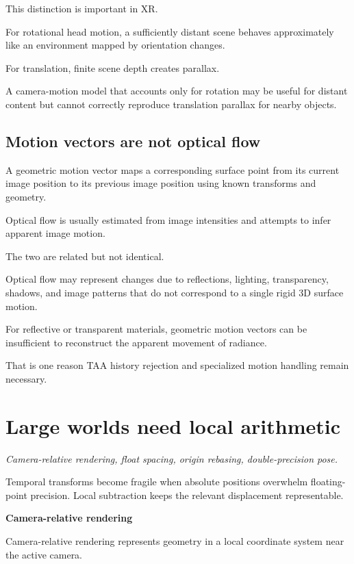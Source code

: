 This distinction is important in XR.

For rotational head motion, a sufficiently distant scene behaves approximately like an environment mapped by orientation changes.

For translation, finite scene depth creates parallax.

A camera-motion model that accounts only for rotation may be useful for distant content but cannot correctly reproduce translation parallax for nearby objects.

\subsection{Motion vectors are not optical flow}\label{02-foundations-ii-ch036-motion-vectors-are-not-optical-flow}

A geometric motion vector maps a corresponding surface point from its current image position to its previous image position using known transforms and geometry.

Optical flow is usually estimated from image intensities and attempts to infer apparent image motion.

The two are related but not identical.

Optical flow may represent changes due to reflections, lighting, transparency, shadows, and image patterns that do not correspond to a single rigid 3D surface motion.

For reflective or transparent materials, geometric motion vectors can be insufficient to reconstruct the apparent movement of radiance.

That is one reason TAA history rejection and specialized motion handling remain necessary.

\section{Large worlds need local arithmetic}\label{02-foundations-ii-ch036-large-worlds-need-local-arithmetic}

\emph{Camera-relative rendering, float spacing, origin rebasing, double-precision pose.}

Temporal transforms become fragile when absolute positions overwhelm floating-point precision. Local subtraction keeps the relevant displacement representable.

\textbf{Camera-relative rendering}

Camera-relative rendering represents geometry in a local coordinate system near the active camera.

